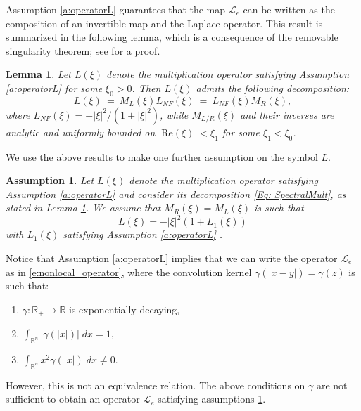 \documentclass[11pt]{amsart}   	%
\theoremstyle{plain}
\numberwithin{equation}{section}
\newtheorem{lemma}[thm]{Lemma}
\newtheorem{assumption}[thm]{Assumption}
\def\R{\mathbb{R}}
\newcommand{\JMS}[1]{{\color{orange} {\bf J. Siktar:} [#1] }}
\begin{document}
Assumption \ref{a:operatorL} guarantees that the map $\mathcal{L}_e$ can be written as the composition of an invertible map and the Laplace operator. This result is summarized in the following lemma, which is a consequence of the removable singularity theorem; see \cite[Lemma 3.9]{jaramillo2019effect} for a proof.
\begin{lemma}\label{l:decomposeL}
Let $L(\xi)$ denote the multiplication operator satisfying Assumption \ref{a:operatorL} for some $\xi_0 >0$. Then $L(\xi)$ admits the following decomposition:
\begin{equation}\label{Eq: SpectralMult}
L(\xi) \ = \ M_L(\xi) L_{NF}(\xi) \ = \ L_{NF}(\xi) M_R(\xi),
\end{equation}
where $L_{NF}(\xi) = - |\xi|^2/ (1+ |\xi|^2)$, while $M_{L/R}(\xi)$ and their inverses are analytic and uniformly bounded on $| \mathrm{Re}(\xi)| < \xi_1$ for some $\xi_1 < \xi_0$. 
\end{lemma}

We use the above results  to make one further assumption on the symbol $L$.

\begin{assumption}\label{a:decomposeL}
Let $L(\xi)$ denote the multiplication operator satisfying Assumption \ref{a:operatorL} and consider its decomposition \eqref{Eq: SpectralMult}, as stated in Lemma \ref{l:decomposeL}. We assume that $M_R(\xi) = M_L(\xi)$ is such that 
 \[ L(\xi) = -|\xi|^2 (1 + L_1(\xi))\]
 with $L_1(\xi)$ satisfying Assumption \ref{a:operatorL} .
\end{assumption}





Notice that Assumption \ref{a:operatorL} implies that we can write the operator $\mathcal{L}_e $ as in \eqref{e:nonlocal_operator},
where the convolution kernel $\gamma(|x-y|) = \gamma(z)$  is such that:
\begin{enumerate}[label=\textbf{P\arabic*}]
\item\label{Q1} $\gamma: \R_+ \longrightarrow \R$ is exponentially decaying,
\item\label{Q2} $\int_{\mathbb{R}^n} | \gamma(|x|)| \; dx = 1$,
\item \label{Q3}$\int_{\mathbb{R}^n} x^2 \gamma(|x|) \; dx \neq 0$.
\end{enumerate}
However,  this is not an equivalence relation. The above conditions on $\gamma$ are not sufficient to obtain an operator $\mathcal{L}_e$ satisfying assumptions \ref{a:decomposeL}.
\end{document}
